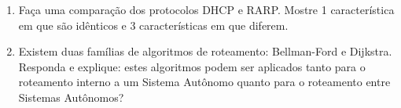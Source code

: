 \documentclass[a4paper,11pt]{article}
\begin{document}
\begin{enumerate}
\item Faça uma comparação dos protocolos DHCP e RARP. Mostre 1 característica em
que são idênticos e 3 características em que diferem.

\item Existem duas famílias de algoritmos de roteamento: Bellman-Ford e
Dijkstra. Responda e explique: estes algoritmos podem ser aplicados tanto para o
roteamento interno a um Sistema Autônomo quanto para o roteamento entre Sistemas
Autônomos?


\end{enumerate}

\end{document}
